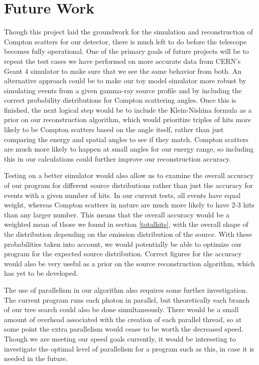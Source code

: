 \section{Future Work}
Though this project laid the groundwork for the simulation and reconstruction of Compton scatters for our detector, there is much left to do before the telescope becomes fully operational. One of the primary goals of future projects will be to repeat the test cases we have performed on more accurate data from CERN's Geant 4 simulator to make sure that we see the same behavior from both. An alternative approach could be to make our toy model simulator more robust by simulating events from a given gamma-ray source profile and by including the correct probability distributions for Compton scattering angles. Once this is finished, the next logical step would be to include the Klein-Nishina formula as a prior on our reconstruction algorithm, which would prioritize triples of hits more likely to be Compton scatters based on the angle itself, rather than just comparing the energy and spatial angles to see if they match. Compton scatters are much more likely to happen at small angles for our energy range, so including this in our calculations could further improve our reconstruction accuracy.

Testing on a better simulator would also allow us to examine the overall accuracy of our program for different source distributions rather than just the accuracy for events with a given number of hits. In our current tests, all events have equal weight, whereas Compton scatters in nature are much more likely to have 2-3 hits than any larger number. This means that the overall accuracy would be a weighted mean of those we found in section \ref{totalhits}, with the overall shape of the distribution depending on the emission distribution of the source. With these probabilities taken into account, we would potentially be able to optimize our program for the expected source distribution. Correct figures for the accuracy would also be very useful as a prior on the source reconstruction algorithm, which has yet to be developed.

The use of parallelism in our algorithm also requires some further investigation. The current program runs each photon in parallel, but theoretically each branch of our tree search could also be done simultaneously. There would be a small amount of overhead associated with the creation of each parallel thread, so at some point the extra parallelism would cease to be worth the decreased speed. Though we are meeting our speed goals currently, it would be interesting to investigate the optimal level of parallelism for a program such as this, in case it is needed in the future. 
